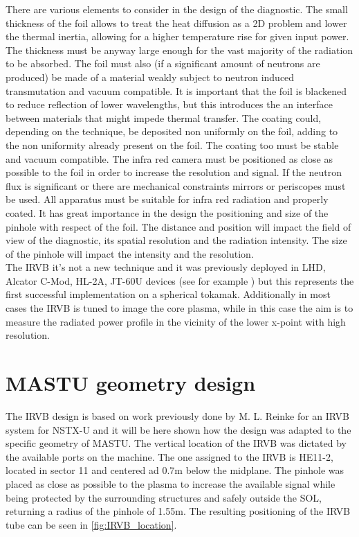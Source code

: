 There are various elements to consider in the design of the diagnostic.
The small thickness of the foil allows to treat the heat diffusion as a 2D problem and lower the thermal inertia, allowing for a higher temperature rise for given input power. The thickness must be anyway large enough for the vast majority of the radiation to be absorbed. The foil must also (if a significant amount of neutrons are produced) be made of a material weakly subject to neutron induced transmutation and vacuum compatible.\cite{Mukai2021}
It is important that the foil is blackened to reduce reflection of lower wavelengths, but this introduces the an interface between materials that might impede thermal transfer. The coating could, depending on the technique, be deposited non uniformly on the foil, adding to the non uniformity already present on the foil. The coating too must be stable and vacuum compatible. \cite{Mukai2016}
The infra red camera must be positioned as close as possible to the foil in order to increase the resolution and signal. If the neutron flux is significant or there are mechanical constraints mirrors or periscopes must be used. All apparatus must be suitable for infra red radiation and properly coated.
It has great importance in the design the positioning and size of the pinhole with respect of the foil. The distance and position will impact the field of view of the diagnostic, its spatial resolution and the radiation intensity. The size of the pinhole will impact the intensity and the resolution.\\
The IRVB it's not a new technique and it was previously deployed in LHD, Alcator C-Mod, HL-2A, JT-60U devices (see for example \cite{Peterson2000,PETERSON2010,Reinke2018a,Gao2013,Peterson2007}) but this represents the first successful implementation on a spherical tokamak. Additionally in most cases the IRVB is tuned to image the core plasma, while in this case the aim is to measure the radiated power profile in the vicinity of the lower x-point with high resolution.


\section{MASTU geometry design}\label{MASTU geometry design}
The IRVB design is based on work previously done by M. L. Reinke for an IRVB system for NSTX-U \cite{VanEden2016} and it will be here shown how the design was adapted to the specific geometry of MASTU.
The vertical location of the IRVB was dictated by the available ports on the machine. The one assigned to the IRVB is HE11-2, located in sector 11 and centered ad 0.7m below the midplane. The pinhole was placed as close as possible to the plasma to increase the available signal while being protected by the surrounding structures and safely outside the SOL, returning a radius of the pinhole of 1.55m. The resulting positioning of the IRVB tube can be seen in \autoref{fig:IRVB_location}. 

